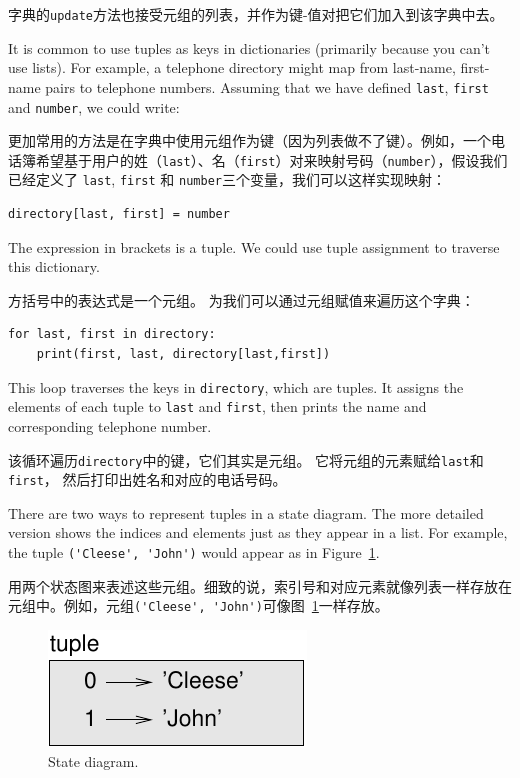 字典的\lstinline{update}方法也接受元组的列表，并作为键-值对把它们加入到该字典中去。
  

It is common to use tuples as keys in dictionaries (primarily because
you can't use lists).  For example, a telephone directory might map
from last-name, first-name pairs to telephone numbers.  Assuming
that we have defined {\tt last}, {\tt first} and {\tt number}, we
could write:

更加常用的方法是在字典中使用元组作为键（因为列表做不了键）。例如，一个电话簿希望基于用户的姓（\lstinline {last}）、名（\lstinline {first}）对来映射号码（\lstinline {number}），假设我们已经定义了 \lstinline {last}, \lstinline {first} 和 \lstinline {number}三个变量，我们可以这样实现映射：

\begin{lstlisting}
directory[last, first] = number
\end{lstlisting}
%
The expression in brackets is a tuple.  We could use tuple
assignment to traverse this dictionary.

方括号中的表达式是一个元组。 为我们可以通过元组赋值来遍历这个字典：

\begin{lstlisting}
for last, first in directory:
    print(first, last, directory[last,first])
\end{lstlisting}

%
This loop traverses the keys in {\tt directory}, which are tuples.  It
assigns the elements of each tuple to {\tt last} and {\tt first}, then
prints the name and corresponding telephone number.

该循环遍历\lstinline{directory}中的键，它们其实是元组。
它将元组的元素赋给\lstinline{last}和\lstinline{first}， 然后打印出姓名和对应的电话号码。

There are two ways to represent tuples in a state diagram.  The more
detailed version shows the indices and elements just as they appear in
a list.  For example, the tuple \verb"('Cleese', 'John')" would appear
as in Figure~\ref{fig.tuple1}.

用两个状态图来表述这些元组。细致的说，索引号和对应元素就像列表一样存放在元组中。例如，元组\lstinline{('Cleese', 'John')}可像图~\ref{fig.tuple1}一样存放。
 

\begin{figure}
\centerline
{\includegraphics[scale=0.8]{../source/figs/tuple1.pdf}}
\caption{State diagram.}
\label{fig.tuple1}
\end{figure}

